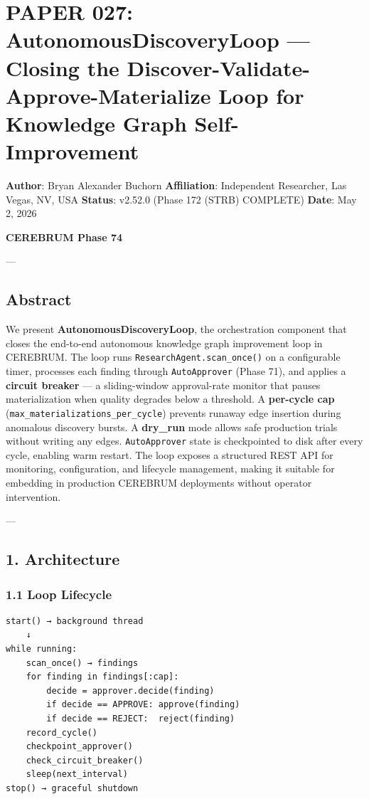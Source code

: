 \section{PAPER 027: AutonomousDiscoveryLoop — Closing the Discover-Validate-Approve-Materialize Loop for Knowledge Graph Self-Improvement}

\textbf{Author}: Bryan Alexander Buchorn  
\textbf{Affiliation}: Independent Researcher, Las Vegas, NV, USA  
\textbf{Status}: v2.52.0 (Phase 172 (STRB) COMPLETE)
\textbf{Date}: May 2, 2026

\textbf{CEREBRUM Phase 74}

---

\subsection{Abstract}

We present \textbf{AutonomousDiscoveryLoop}, the orche\-stration component that closes the end-to-end autonomous knowledge graph improvement loop in CEREBRUM. The loop runs \texttt{ResearchAgent.scan\_once()} on a confi\-gurable timer, processes each finding through \texttt{AutoApprover} (Phase 71), and applies a \textbf{circuit breaker} — a sliding-window approval-rate monitor that pauses mater\-ialization when quality degrades below a threshold. A \textbf{per-cycle cap} (\texttt{max\_materializations\_per\_cycle}) prevents runaway edge insertion during anomalous discovery bursts. A \textbf{dry\_run} mode allows safe production trials without writing any edges. \texttt{AutoApprover} state is check\-pointed to disk after every cycle, enabling warm restart. The loop exposes a structured REST API for monitoring, confi\-guration, and lifecycle management, making it suitable for embedding in production CEREBRUM deployments without operator inter\-vention.

---

\subsection{1. Archit\-ecture}

\subsubsection{1.1 Loop Lifecycle}

\begin{lstlisting}
start() → background thread
    ↓
while running:
    scan_once() → findings
    for finding in findings[:cap]:
        decide = approver.decide(finding)
        if decide == APPROVE: approve(finding)
        if decide == REJECT:  reject(finding)
    record_cycle()
    checkpoint_approver()
    check_circuit_breaker()
    sleep(next_interval)
stop() → graceful shutdown
\end{lstlisting}

